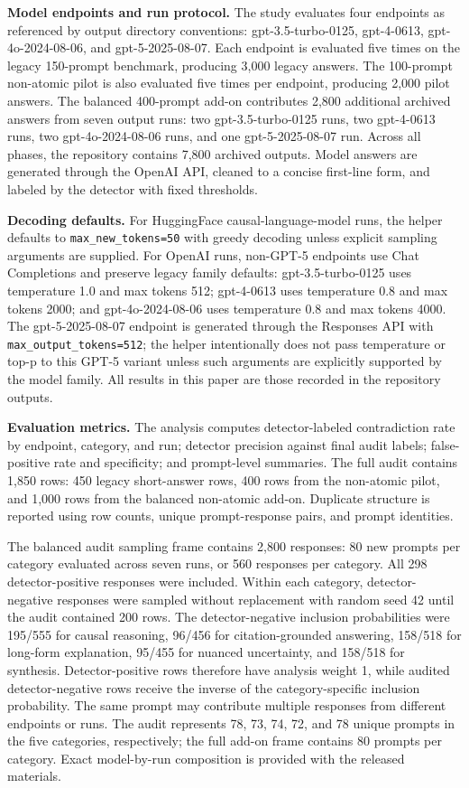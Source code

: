 \documentclass[11pt]{article}
\newcommand{\code}[1]{\texttt{#1}}
\begin{document}
\textbf{Model endpoints and run protocol.} The study evaluates four endpoints as referenced by output directory conventions: gpt-3.5-turbo-0125, gpt-4-0613, gpt-4o-2024-08-06, and gpt-5-2025-08-07. Each endpoint is evaluated five times on the legacy 150-prompt benchmark, producing 3,000 legacy answers. The 100-prompt non-atomic pilot is also evaluated five times per endpoint, producing 2,000 pilot answers. The balanced 400-prompt add-on contributes 2,800 additional archived answers from seven output runs: two gpt-3.5-turbo-0125 runs, two gpt-4-0613 runs, two gpt-4o-2024-08-06 runs, and one gpt-5-2025-08-07 run. Across all phases, the repository contains 7,800 archived outputs. Model answers are generated through the OpenAI API, cleaned to a concise first-line form, and labeled by the detector with fixed thresholds.

\textbf{Decoding defaults.} For HuggingFace causal-language-model runs, the helper defaults to \code{max\_new\_tokens=50} with greedy decoding unless explicit sampling arguments are supplied. For OpenAI runs, non-GPT-5 endpoints use Chat Completions and preserve legacy family defaults: gpt-3.5-turbo-0125 uses temperature 1.0 and max tokens 512; gpt-4-0613 uses temperature 0.8 and max tokens 2000; and gpt-4o-2024-08-06 uses temperature 0.8 and max tokens 4000. The gpt-5-2025-08-07 endpoint is generated through the Responses API with \code{max\_output\_tokens=512}; the helper intentionally does not pass temperature or top-p to this GPT-5 variant unless such arguments are explicitly supported by the model family. All results in this paper are those recorded in the repository outputs.


\textbf{Evaluation metrics.} The analysis computes detector-labeled contradiction rate by endpoint, category, and run; detector precision against final audit labels; false-positive rate and specificity; and prompt-level summaries. The full audit contains 1,850 rows: 450 legacy short-answer rows, 400 rows from the non-atomic pilot, and 1,000 rows from the balanced non-atomic add-on. Duplicate structure is reported using row counts, unique prompt-response pairs, and prompt identities.

The balanced audit sampling frame contains 2,800 responses: 80 new prompts per category evaluated across seven runs, or 560 responses per category. All 298 detector-positive responses were included. Within each category, detector-negative responses were sampled without replacement with random seed 42 until the audit contained 200 rows. The detector-negative inclusion probabilities were 195/555 for causal reasoning, 96/456 for citation-grounded answering, 158/518 for long-form explanation, 95/455 for nuanced uncertainty, and 158/518 for synthesis. Detector-positive rows therefore have analysis weight 1, while audited detector-negative rows receive the inverse of the category-specific inclusion probability. The same prompt may contribute multiple responses from different endpoints or runs. The audit represents 78, 73, 74, 72, and 78 unique prompts in the five categories, respectively; the full add-on frame contains 80 prompts per category. Exact model-by-run composition is provided with the released materials.
\end{document}
